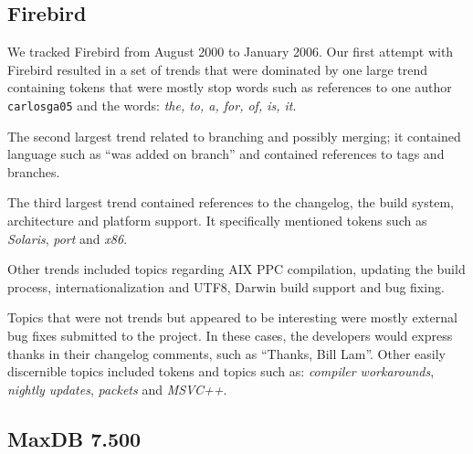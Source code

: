 \documentclass[times, 10pt,twocolumn]{article}
\begin{document}


\subsection{Firebird}


We tracked Firebird from August 2000 to January 2006.
Our first attempt with Firebird resulted in a set of trends that were
dominated by one large trend containing tokens that were mostly stop
words such as references to one author
\texttt{carlosga05} and the words: \emph{the, to, a, for, of, is, it}.

The second largest trend related to branching and possibly merging; it
contained language such as ``was added on branch'' and contained
references to tags and branches.

The third largest trend contained references to the changelog, the
build system, architecture and platform support. It specifically
mentioned tokens such as \emph{Solaris}, \emph{port} and \emph{x86}.

Other trends included topics regarding AIX PPC compilation, updating
the build process, internationalization and UTF8, Darwin build support
and bug fixing.

Topics that were not trends but appeared to be  interesting were mostly external bug
fixes submitted to the project.
 In these cases, the developers would express thanks in their changelog comments, such as ``Thanks, Bill Lam''.  Other easily discernible topics included 
 tokens and topics such as: \emph{compiler workarounds}, \emph{nightly updates}, \emph{packets} and \emph{MSVC++}.

\subsection{MaxDB 7.500}



\end{document}
